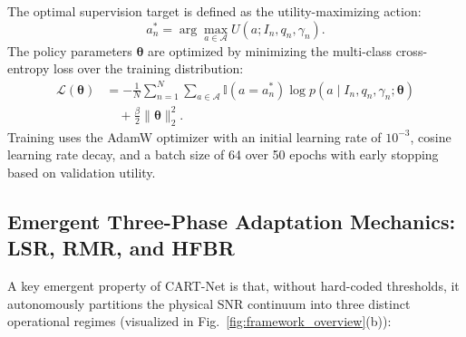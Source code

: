 The optimal supervision target is defined as the utility-maximizing action:
\begin{equation}
a_n^* = \arg\max_{a \in \mathcal{A}} U(a; I_n, q_n, \gamma_n).
\end{equation}
The policy parameters $\boldsymbol{\theta}$ are optimized by minimizing the multi-class cross-entropy loss over the training distribution:
\begin{equation}
\begin{split}
\mathcal{L}(\boldsymbol{\theta}) &= -\frac{1}{N} \sum_{n=1}^N \sum_{a \in \mathcal{A}} \mathbb{I}(a = a_n^*) \log p(a \mid I_n, q_n, \gamma_n; \boldsymbol{\theta}) \\
&\quad + \frac{\beta}{2} \|\boldsymbol{\theta}\|_2^2.
\end{split}
\end{equation}
Training uses the AdamW optimizer with an initial learning rate of $10^{-3}$, cosine learning rate decay, and a batch size of 64 over 50 epochs with early stopping based on validation utility.

\subsection{Emergent Three-Phase Adaptation Mechanics: LSR, RMR, and HFBR}
A key emergent property of CART-Net is that, without hard-coded thresholds, it autonomously partitions the physical SNR continuum into three distinct operational regimes (visualized in Fig.~\ref{fig:framework_overview}(b)):

